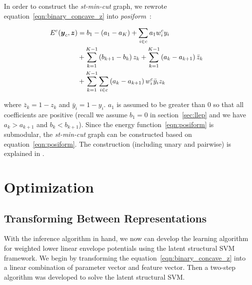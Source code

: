 \documentclass[sigconf,anonymous,review]{acmart}
\renewcommand{\cite}{\citep}
\begin{document}
In order to construct the \emph{st-min-cut} graph, we rewrote
equation~\eqref{eqn:binary_concave_z} into
\emph{posiform}~\cite{Boros:MATH02}:

\begin{align}
  \label{eqn:posiform}  
  E^c({\boldsymbol{y}}_c, {\boldsymbol{z}})
  &= b_1 - (a_1 - a_K) + \sum_{i \in c} a_1 w^c_i y_i \notag\\
  & + \sum_{k = 1}^{K - 1} \left( b_{k+1} - b_k \right) z_k
    + \sum_{k = 1}^{K - 1} \left( a_k - a_{k+1} \right)
    \bar{z}_k\notag\\
  & + \sum_{k = 1}^{K - 1} \sum_{i \in c} \left( a_k - a_{k+1}
    \right) w^c_i \bar{y}_i z_k
\end{align}

\noindent where $\bar{z}_k = 1 - z_k$ and $\bar{y}_i = 1 - y_i$.
$a_1$ is assumed to be greater than $0$ so that all coefficients
are positive (recall we assume $b_1=0$ in section~\ref{sec:llep}
and we have $a_k > a_{k+1}$ and $b_k < b_{k+1}$). Since the energy function~\eqref{eqn:posiform}
is submodular, the \emph{st-min-cut} graph can be constructed 
based on equation~\eqref{eqn:posiform}. The construction (including 
unary and pairwise) is explained in . 



\section{Optimization}
\label{sec:opt}

\subsection{Transforming Between Representations}
\label{sec:learning}
With the inference algorithm in hand, we now can develop the
learning algorithm for weighted lower linear envelope potentials
using the latent structural SVM framework. We begin by
transforming the equation~\eqref{eqn:binary_concave_z} into a
linear combination of parameter vector and feature vector. Then a
two-step algorithm was developed to solve the latent structural
SVM.
\end{document}
